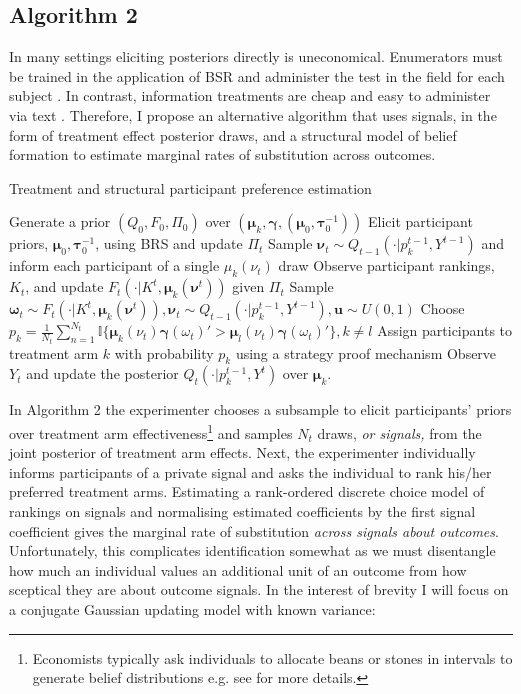 \documentclass[twoside,11pt]{article}
\begin{document}
\subsection{Algorithm 2}
In many settings eliciting posteriors directly is uneconomical. Enumerators must 
be trained in the application of BSR and administer the test in the field for 
each subject \citep{glennerster}. In contrast, information treatments are cheap and easy to administer 
via text \citep{banerjee2021a}. Therefore, I propose an alternative algorithm that uses signals, 
in the form of treatment effect posterior draws, 
and a structural model of belief formation to estimate marginal rates of 
substitution across outcomes.

\begin{algorithm}
  \caption{Treatment and structural participant preference estimation }\label{alg:cap}
  \begin{algorithmic}
  \State Generate a prior $(Q_0, F_0, \Pi_0)$ over $\left(\bm{\mu}_k, \bm{\gamma}, (\bm{\mu}_0, \bm{\tau}_0^{-1})\right)$
  \State Elicit participant priors, $\bm{\mu}_0, \bm{\tau}_0^{-1}$, using BRS and update $\Pi_t$
  \EndIf
  \State Sample $\bm{\nu}_{t} \sim Q_{t-1}(\cdot | p_{k}^{t-1}, Y^{t-1})$ and inform each 
  participant of a single $\mu_k(\nu_{t})$ draw
  \State Observe participant rankings, $K_t$, and update $F_{t}( \cdot | K^{t}, \bm{\mu}_k(\bm{\nu}^{t}))$ 
  given $\Pi_t$
  \State Sample $\bm{\omega}_{t} \sim F_{t}( \cdot | K^{t}, \bm{\mu}_k(\bm{\nu}^{t})), \bm{\nu}_t \sim Q_{t-1}(\cdot | p_{k}^{t-1}, Y^{t-1}), \bm{u} \sim U(0,1)$ 
  \State Choose $p_k = \frac{1}{N_t} 
  \sum^{N_t}_{n=1} \mathbb{I}\{\bm{\mu}_k(\nu_{t}) \bm{\gamma}(\omega_{t})' > \bm{\mu}_l(\nu_{t}) \bm{\gamma}(\omega_{t})'\}, k \neq l$ 
  \State Assign participants to treatment arm $k$ with probability $p_{k}$ using a strategy proof mechanism
  \State Observe $Y_t$ and update the posterior $Q_{t}(\cdot | p_k^{t-1}, Y^{t})$ over $\bm{\mu}_k$. 
  \EndFor
  \end{algorithmic}
  \end{algorithm}

In Algorithm 2 the experimenter chooses a subsample to elicit participants'
 priors over treatment arm 
effectiveness\footnote{Economists typically ask individuals to allocate beans or 
stones in intervals to generate belief distributions e.g. see \cite{ar-delavande} for more details.}
and samples $N_t$ draws, \emph{or signals,} from the joint posterior of treatment arm effects. 
Next, the experimenter individually informs participants of a private signal
and asks the individual to rank his/her preferred treatment arms. Estimating a 
rank-ordered discrete choice model of rankings on signals and normalising 
estimated coefficients by the first signal coefficient gives the marginal  
rate of substitution \emph{across signals about outcomes}. Unfortunately, this 
complicates identification somewhat as we must disentangle how much an individual 
values an additional unit of an outcome from how sceptical they are about 
outcome signals. In the interest of brevity I will focus on a conjugate Gaussian 
updating model with known variance: 
\end{document}
